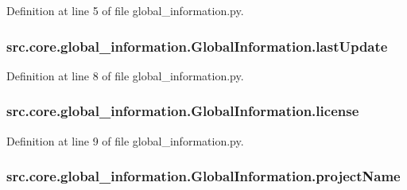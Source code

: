 Definition at line 5 of file global\+\_\+information.\+py.

\hypertarget{classsrc_1_1core_1_1global__information_1_1_global_information_a4c3c1476f39150406420455273d6dbd0}{
\subsubsection[{last\+Update}]{\setlength{\rightskip}{0pt plus 5cm}src.\+core.\+global\+\_\+information.\+Global\+Information.\+last\+Update}}\label{classsrc_1_1core_1_1global__information_1_1_global_information_a4c3c1476f39150406420455273d6dbd0}


Definition at line 8 of file global\+\_\+information.\+py.

\hypertarget{classsrc_1_1core_1_1global__information_1_1_global_information_ae9146603dba3654d72081b02e68c99d7}{
\subsubsection[{license}]{\setlength{\rightskip}{0pt plus 5cm}src.\+core.\+global\+\_\+information.\+Global\+Information.\+license}}\label{classsrc_1_1core_1_1global__information_1_1_global_information_ae9146603dba3654d72081b02e68c99d7}


Definition at line 9 of file global\+\_\+information.\+py.

\hypertarget{classsrc_1_1core_1_1global__information_1_1_global_information_aa75b2e04e65ddb9d9f7f78c15d049961}{
\subsubsection[{project\+Name}]{\setlength{\rightskip}{0pt plus 5cm}src.\+core.\+global\+\_\+information.\+Global\+Information.\+project\+Name}}\label{classsrc_1_1core_1_1global__information_1_1_global_information_aa75b2e04e65ddb9d9f7f78c15d049961}


